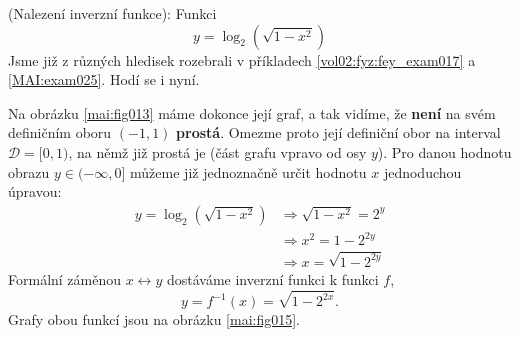 \begin{mdframed}[style=mdexam]
  \begin{example}\label{MAI:exam027}
    (Nalezení inverzní funkce): Funkci 
    \begin{equation*}
      y = \log_2(\sqrt{1-x^2})
    \end{equation*}
    Jsme již z různých hledisek rozebrali v příkladech \ref{vol02:fyz:fey_exam017} a
    \ref{MAI:exam025}. Hodí se i nyní.

    {\centering
    \captionsetup{type=figure}
    \par}
    
    Na obrázku \ref{mai:fig013} máme dokonce její graf, a tak vidíme, že \textbf{není} na svém 
    definičním oboru \((-1, 1)\) \textbf{prostá}. Omezme proto její definiční obor na interval 
    \(\mathcal{D} = [0, 1)\), na němž již prostá je (část grafu vpravo od osy \(y\)). Pro danou 
    hodnotu obrazu \(y \in (-\infty,0]\) můžeme již jednoznačně určit hodnotu \(x\) jednoduchou 
    úpravou:
    \begin{align*}
      y = \log_2(\sqrt{1-x^2}) &\Rightarrow \sqrt{1-x^2} = 2^y   \\
                               &\Rightarrow x^2 = 1 - 2^{2y}     \\
                               &\Rightarrow x = \sqrt{1 - 2^{2y}}
    \end{align*}
    Formální záměnou \(x \leftrightarrow y\) dostáváme inverzní funkci k funkci \(f\),
    \begin{equation*}
      y =f^{-1}(x) = \sqrt{1 - 2^{2x}}.
    \end{equation*}
    Grafy obou funkcí jsou na obrázku \ref{mai:fig015}.
  \end{example}
\end{mdframed}